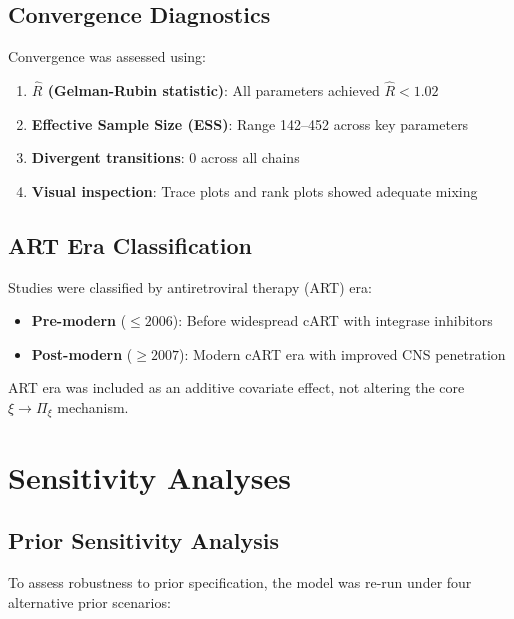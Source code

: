 \documentclass[11pt]{article}
\begin{document}
\subsection{Convergence Diagnostics}

Convergence was assessed using:
\begin{enumerate}
    \item \textbf{$\hat{R}$ (Gelman-Rubin statistic)}: All parameters achieved $\hat{R} < 1.02$
    \item \textbf{Effective Sample Size (ESS)}: Range 142--452 across key parameters
    \item \textbf{Divergent transitions}: 0 across all chains
    \item \textbf{Visual inspection}: Trace plots and rank plots showed adequate mixing
\end{enumerate}

\subsection{ART Era Classification}

Studies were classified by antiretroviral therapy (ART) era:
\begin{itemize}
    \item \textbf{Pre-modern} ($\leq 2006$): Before widespread cART with integrase inhibitors
    \item \textbf{Post-modern} ($\geq 2007$): Modern cART era with improved CNS penetration
\end{itemize}

ART era was included as an additive covariate effect, not altering the core $\xi \to \Pi_\xi$ mechanism.

\newpage
\section{Sensitivity Analyses}
\label{sec:sensitivity}

\subsection{Prior Sensitivity Analysis}

To assess robustness to prior specification, the model was re-run under four alternative prior scenarios:
\end{document}
